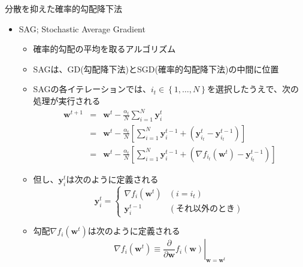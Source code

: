 \documentclass[dvipdfmx,notheorems,t]{beamer}
\begin{document}
\begin{frame}{分散を抑えた確率的勾配降下法}

\begin{itemize}
	\item SAG; Stochastic Average Gradient
	\begin{itemize}
		\item 確率的勾配の平均を取るアルゴリズム
		\item SAGは、GD(勾配降下法)とSGD(確率的勾配降下法)の中間に位置
		\newline
		
		\item SAGの各イテレーションでは、$i_t \in \left\{ 1, \ldots, N \right\}$を選択したうえで、次の処理が実行される
		\begin{eqnarray}
			\bm{w}^{t + 1} &=& \bm{w}^t - \frac{\alpha_t}{N} \sum_{i = 1}^N \bm{y}_i^t \\
			&=& \bm{w}^t - \frac{\alpha_t}{N} \left[ \sum_{i = 1}^N \bm{y}_i^{t - 1} + \left( \bm{y}_{i_t}^t - \bm{y}_{i_t}^{t - 1} \right) \right] \\
			&=& \bm{w}^t - \frac{\alpha_t}{N} \left[ \sum_{i = 1}^N \bm{y}_i^{t - 1} + \left( \nabla f_{i_t}(\bm{w}^t) - \bm{y}_{i_t}^{t - 1} \right) \right]
		\end{eqnarray}
		
		\item 但し、$\bm{y}_i^t$は次のように定義される
		\begin{equation}
			\bm{y}_i^t = \left\{ \begin{array}{ll} \nabla f_i(\bm{w}^t) & (i = i_t) \\ \bm{y}_i^{t - 1} & (\text{それ以外のとき}) \end{array} \right.
		\end{equation}
		
		\item 勾配$\nabla f_i(\bm{w}^t)$は次のように定義される
		\begin{equation}
			\nabla f_i(\bm{w}^t) \equiv \left. \frac{\partial}{\partial \bm{w}} f_i(\bm{w}) \right|_{\bm{w} = \bm{w}^t}
		\end{equation}
	\end{itemize}
\end{itemize}

\end{frame}
\end{document}
